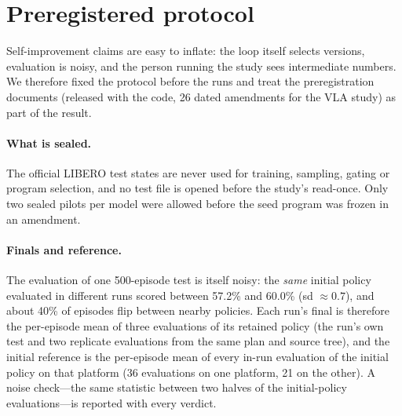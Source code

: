 \section{Preregistered protocol}
\label{sec:protocol}

Self-improvement claims are easy to inflate: the loop itself selects versions, evaluation is noisy, and the person running the study sees intermediate numbers. We therefore fixed the protocol before the runs and treat the preregistration documents (released with the code, 26 dated amendments for the VLA study) as part of the result.

\paragraph{What is sealed.} The official LIBERO test states are never used for training, sampling, gating or program selection, and no test file is opened before the study's read-once. Only two sealed pilots per model were allowed before the seed program was frozen in an amendment.

\paragraph{Finals and reference.} The evaluation of one 500-episode test is itself noisy: the \emph{same} initial policy evaluated in different runs scored between 57.2\% and 60.0\% (sd $\approx 0.7$), and about 40\% of episodes flip between nearby policies. Each run's final is therefore the per-episode mean of three evaluations of its retained policy (the run's own test and two replicate evaluations from the same plan and source tree), and the initial reference is the per-episode mean of every in-run evaluation of the initial policy on that platform (36 evaluations on one platform, 21 on the other). A noise check---the same statistic between two halves of the initial-policy evaluations---is reported with every verdict.

